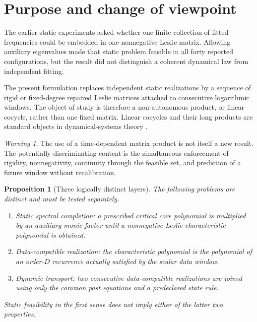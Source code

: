 \documentclass[11pt]{amsart}
\numberwithin{equation}{section}
\theoremstyle{plain}
\newtheorem{proposition}[theorem]{Proposition}
\theoremstyle{definition}
\theoremstyle{remark}
\newtheorem{warning}[theorem]{Warning}
\begin{document}
\section{Purpose and change of viewpoint}
\label{sec:purpose}

The earlier static experiments asked whether one finite collection of fitted frequencies could be embedded in one nonnegative Leslie matrix.  Allowing auxiliary eigenvalues made that static problem feasible in all forty reported configurations, but the result did not distinguish a coherent dynamical law from independent fitting.

The present formulation replaces independent static realizations by a sequence of rigid or fixed-degree repaired Leslie matrices attached to consecutive logarithmic windows.  The object of study is therefore a non-autonomous product, or linear cocycle, rather than one fixed matrix.  Linear cocycles and their long products are standard objects in dynamical-systems theory \cite{DuarteKlein2016}.

\begin{warning}
\label{warn:no_automatic_novelty}
The use of a time-dependent matrix product is not itself a new result.  The potentially discriminating content is the simultaneous enforcement of rigidity, nonnegativity, continuity through the feasible set, and prediction of a future window without recalibration.
\end{warning}

\begin{proposition}[Three logically distinct layers]
\label{prop:three_layers}
The following problems are distinct and must be tested separately.
\begin{enumerate}
\item \emph{Static spectral completion:} a prescribed critical core polynomial is multiplied by an auxiliary monic factor until a nonnegative Leslie characteristic polynomial is obtained.
\item \emph{Data-compatible realization:} the characteristic polynomial is the polynomial of an order-$D$ recurrence actually satisfied by the scalar data window.
\item \emph{Dynamic transport:} two consecutive data-compatible realizations are joined using only the common past equations and a predeclared state rule.
\end{enumerate}
Static feasibility in the first sense does not imply either of the latter two properties.
\end{proposition}
\end{document}
